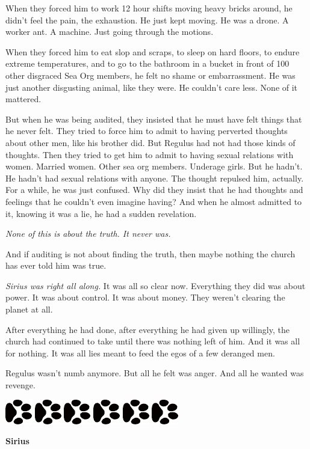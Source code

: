 \documentclass[12pt,twoside,openright]{memoir}
\newcommand{\myrulez}{	
	\begin{center}
		\hspace{.5em}
		\includegraphics[angle=60]{dogprint.pdf}
		\hspace{.5em}
		\includegraphics[angle=120]{dogprint.pdf}
		\hspace{.5em}
		\includegraphics[angle=60]{dogprint.pdf}
		\hspace{.5em}
		\includegraphics[angle=120]{dogprint.pdf}
		\hspace{.5em}
		\includegraphics[angle=60]{dogprint.pdf}
		\hspace{.5em}
		\includegraphics[angle=120]{dogprint.pdf}
		\hspace{.5em}
	\end{center}
}
\begin{document}
When they forced him to work 12 hour shifts moving heavy bricks around, he didn't feel the pain, the exhaustion. He just kept moving. He was a drone. A worker ant. A machine. Just going through the motions.

When they forced him to eat slop and scraps, to sleep on hard floors, to endure extreme temperatures, and to go to the bathroom in a bucket in front of 100 other disgraced Sea Org members, he felt no shame or embarrassment. He was just another disgusting animal, like they were. He couldn't care less. None of it mattered.

But when he was being audited, they insisted that he must have felt things that he never felt. They tried to force him to admit to having perverted thoughts about other men, like his brother did. But Regulus had not had those kinds of thoughts. Then they tried to get him to admit to having sexual relations with women. Married women. Other sea org members. Underage girls. But he hadn't. He hadn't had sexual relations with anyone. The thought repulsed him, actually. For a while, he was just confused. Why did they insist that he had thoughts and feelings that he couldn't even imagine having? And when he almost admitted to it, knowing it was a lie, he had a sudden revelation. 

\textit{None of this is about the truth. It never was.} 

And if auditing is not about finding the truth, then maybe nothing the church has ever told him was true. 

\textit{Sirius was right all along.} It was all so clear now. Everything they did was about power. It was about control. It was about money. They weren't clearing the planet at all. 

After everything he had done, after everything he had given up willingly, the church had continued to take until there was nothing left of him. And it was all for nothing. It was all lies meant to feed the egos of a few deranged men. 

Regulus wasn't numb anymore. But all he felt was anger. And all he wanted was revenge.

\myrulez

\textbf{Sirius} 
\end{document}

